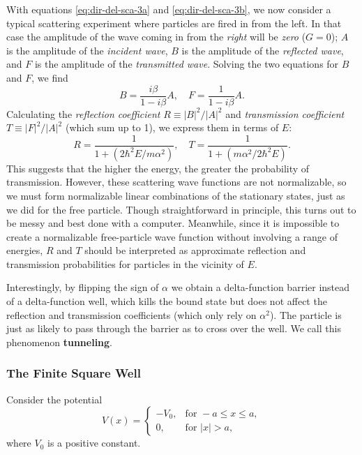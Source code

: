 \documentclass{article}
\begin{document}
With equations \eqref{eq:dir-del-sca-3a} and \eqref{eq:dir-del-sca-3b}, we now
consider a typical scattering experiment where particles are fired in from the
left. In that case the amplitude of the wave coming in from the \emph{right}
will be \emph{zero} ($G = 0$); $A$ is the amplitude of the \emph{incident
wave}, $B$ is the amplitude of the \emph{reflected wave}, and $F$ is the
amplitude of the \emph{transmitted wave}. Solving the two equations for $B$ and
$F$, we find
\begin{equation} \label{eq:dir-del-sca-4}
  B = \frac{i\beta}{1 - i\beta}A, \quad
  F = \frac{1}{1 - i\beta}A.
\end{equation}
Calculating the \emph{reflection coefficient} $R \equiv |B|^2/|A|^2$ and
\emph{transmission coefficient} $T \equiv |F|^2/|A|^2$ (which sum up to 1),
we express them in terms of $E$:
\begin{equation} \label{eq:dir-del-sca-coeff}
  \boxed{
    R = \frac{1}{1 + (2\hbar^2E/m\alpha^2)}, \quad
    T = \frac{1}{1 + (m\alpha^2/2\hbar^2E)}.
  }
\end{equation}
This suggests that the higher the energy, the greater the probability of
transmission. However, these scattering wave functions are not normalizable, so
we must form normalizable linear combinations of the stationary states, just as
we did for the free particle. Though straightforward in principle, this turns
out to be messy and best done with a computer. Meanwhile, since it is
impossible to create a normalizable free-particle wave function without
involving a range of energies, $R$ and $T$ should be interpreted as approximate
reflection and transmission probabilities for particles in the vicinity of $E$.

Interestingly, by flipping the sign of $\alpha$ we obtain a delta-function
barrier instead of a delta-function well, which kills the bound state but does
not affect the reflection and transmission coefficients (which only rely on
$\alpha^2$). The particle is just as likely to pass through the barrier as to
cross over the well. We call this phenomenon \textbf{tunneling}.

\subsubsection{The Finite Square Well}

Consider the potential
\begin{equation} \label{eq:fin-sq-well}
  V(x) =
  \begin{cases}
    -V_0, &\text{for } -a \leq x \leq a, \\
    0, &\text{for } |x| > a,
  \end{cases}
\end{equation}
where $V_0$ is a positive constant.
\end{document}
